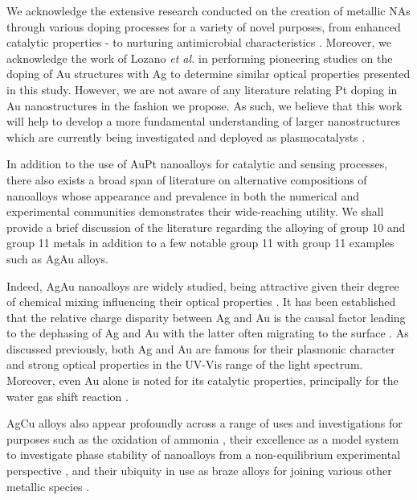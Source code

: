 We acknowledge the extensive research conducted on the creation of metallic NAs through various doping processes for a variety of novel purposes, from enhanced catalytic properties \cite{doi:10.1021/jp070791s,C7NR05871C} - to nurturing antimicrobial characteristics \cite{PATHAK2019e01333}. Moreover, we acknowledge the work of Lozano \textit{et al.} \cite{HWC} in performing pioneering studies on the doping of Au structures with Ag to determine similar optical properties presented in this study. However, we are not aware of any literature relating Pt doping in Au nanostructures in the fashion we propose. As such, we believe that this work will help to develop a more fundamental understanding of larger nanostructures which are currently being investigated and deployed as plasmocatalysts \cite{JorgeStructure}.

In addition to the use of AuPt nanoalloys for catalytic and sensing processes, there also exists a broad span of literature on alternative compositions of nanoalloys whose appearance and prevalence in both the numerical and experimental communities demonstrates their wide-reaching utility. We shall provide a brief discussion of the literature regarding the alloying of group 10 and group 11 metals in addition to a few notable group 11 with group 11 examples such as AgAu alloys. 

Indeed, AgAu nanoalloys are widely studied, being attractive given their degree of chemical mixing influencing their optical properties \cite{C7NR05871C,AgAuNanoparticles,C0CP02845B,Ma2011,doi:10.1021/jp806930t,doi:10.1021/nl0100264,doi:10.1021/jp002438r}. It has been established that the relative charge disparity between Ag and Au is the causal factor leading to the dephasing of Ag and Au with the latter often migrating to the surface \cite{doi:10.1063/1.1492800,doi:10.1021/jp034826+,doi:10.1063/1.2210470}. As discussed previously, both Ag and Au are famous for their plasmonic character and strong optical properties in the UV-Vis range of the light spectrum. Moreover, even Au alone is noted for its catalytic properties, principally for the water gas shift reaction \cite{catal8120627,doi:10.1021/jacs.8b08246,Carter2022-bn}. 

AgCu alloys also appear profoundly across a range of uses and investigations \cite{C5CP00782H,doi:10.1021/acs.inorgchem.9b02172} for purposes such as the oxidation of ammonia \cite{doi:10.1021/acsami.9b16349}, their excellence as a model system to investigate phase stability of nanoalloys from a non-equilibrium experimental perspective \cite{SHENG2002475,MISJAK20104247,doi:10.1063/1.354582,UENISHI19911342}, and their ubiquity in use as braze alloys for joining various other metallic species \cite{ASTHANA2008617,XIONG20101096}. 


